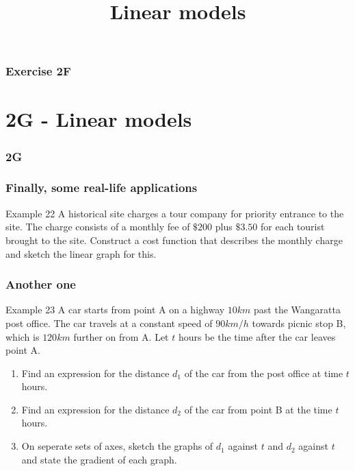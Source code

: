 \documentclass{beamer}
\begin{document}
\begin{frame}
    \frametitle{Exercise 2F}
\end{frame}

\section{2G - Linear models}
\begin{frame}
    \frametitle{2G}
    \begin{center}
        \title{Linear models}
        \maketitle
    \end{center}
\end{frame}

\begin{frame}[t]
    \frametitle{Finally, some real-life applications}
    \begin{block}{Example 22}
        A historical site charges a tour company for priority entrance to the site. The charge
        consists of a monthly fee of $\$200$ plus $\$3.50$ for each tourist brought to the site. Construct
        a cost function that describes the monthly charge and sketch the linear graph for this.
    \end{block}
\end{frame}

\begin{frame}[t]
    \frametitle{Another one}
    \begin{block}{Example 23}
        A car starts from point A on a highway $10km$ past the Wangaratta post office. The car travels at a constant speed of $90km/h$ 
        towards picnic stop B, which is $120km$ further on from A. Let $t$ hours be the time after the car leaves point A.\\
        \begin{enumerate}
            \item Find an expression for the distance $d_1$ of the car from the post office at time $t$ hours.
            \item Find an expression for the distance $d_2$ of the car from point B at the time $t$ hours.
            \item On seperate sets of axes, sketch the graphs of $d_1$ against $t$ and $d_2$ against $t$ and state the gradient of each graph.
        \end{enumerate}
    \end{block}
\end{frame}
\end{document}
